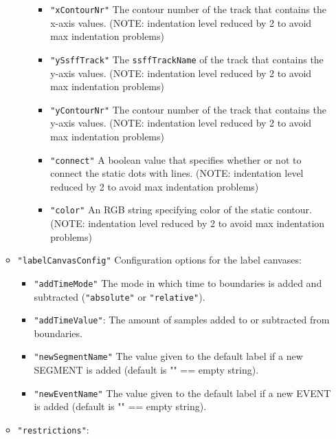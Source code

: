 \documentclass[
]{book}
\begin{document}
\begin{itemize}
\begin{itemize}
\begin{itemize}
\begin{itemize}
      \item
        \texttt{"xContourNr"} The contour number of the track that contains the x-axis values. (NOTE: indentation level reduced by 2 to avoid max indentation problems)
      \item
        \texttt{"ySsffTrack"} The \texttt{ssffTrackName} of the track that contains the y-axis values. (NOTE: indentation level reduced by 2 to avoid max indentation problems)
      \item
        \texttt{"yContourNr"} The contour number of the track that contains the y-axis values. (NOTE: indentation level reduced by 2 to avoid max indentation problems)
      \item
        \texttt{"connect"} A boolean value that specifies whether or not to connect the static dots with lines. (NOTE: indentation level reduced by 2 to avoid max indentation problems)
      \item
        \texttt{"color"} An RGB string specifying color of the static contour. (NOTE: indentation level reduced by 2 to avoid max indentation problems)
      \end{itemize}
    \end{itemize}
  \item
    \texttt{"labelCanvasConfig"} Configuration options for the label
    canvases:

    \begin{itemize}
    \item
      \texttt{"addTimeMode"} The mode in which time to boundaries is
      added and subtracted (\texttt{"absolute"} or \texttt{"relative"}).
    \item
      \texttt{"addTimeValue"}: The amount of samples added to or
      subtracted from boundaries.
    \item
      \texttt{"newSegmentName"} The value given to the default label if a
      new SEGMENT is added (default is "" == empty string).
    \item
      \texttt{"newEventName"} The value given to the default label if a
      new EVENT is added (default is "" == empty string).
    \end{itemize}
  \item
    \texttt{"restrictions"}:


\end{itemize}
\end{itemize}
\end{document}
